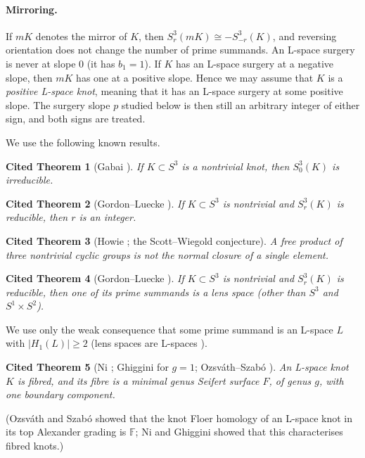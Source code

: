 \documentclass[11pt]{article}
\newtheorem{citedthm}{Cited Theorem}
\theoremstyle{definition}
\newcommand{\F}{\mathbb{F}}
\begin{document}
\paragraph{Mirroring.} If $mK$ denotes the mirror of $K$, then $S^3_r(mK)\cong -S^3_{-r}(K)$, and reversing orientation does not change the number of prime summands. An L-space surgery is never at slope $0$ (it has $b_1=1$). If $K$ has an L-space surgery at a negative slope, then $mK$ has one at a positive slope. Hence we may assume that $K$ is a \emph{positive L-space knot}, meaning that it has an L-space surgery at some positive slope. The surgery slope $p$ studied below is then still an arbitrary integer of either sign, and both signs are treated.

\medskip
We use the following known results.

\begin{citedthm}[Gabai \cite{Gabai}]\label{thm:gabai}
If $K\subset S^3$ is a nontrivial knot, then $S^3_0(K)$ is irreducible.
\end{citedthm}

\begin{citedthm}[Gordon--Luecke \cite{GL87}]\label{thm:GL87}
If $K\subset S^3$ is nontrivial and $S^3_r(K)$ is reducible, then $r$ is an integer.
\end{citedthm}

\begin{citedthm}[Howie \cite{Howie}; the Scott--Wiegold conjecture]\label{thm:howie}
A free product of three nontrivial cyclic groups is not the normal closure of a single element.
\end{citedthm}

\begin{citedthm}[Gordon--Luecke \cite{GL96}]\label{thm:GL96}
If $K\subset S^3$ is nontrivial and $S^3_r(K)$ is reducible, then one of its prime summands is a lens space (other than $S^3$ and $S^1\times S^2$).
\end{citedthm}
We use only the weak consequence that some prime summand is an L-space $L$ with $|H_1(L)|\ge 2$ (lens spaces are L-spaces \cite{OSlens}).

\begin{citedthm}[Ni \cite{Ni}; Ghiggini \cite{Ghiggini} for $g=1$; Ozsv\'ath--Szab\'o \cite{OSlens}]\label{thm:fibred}
An L-space knot $K$ is fibred, and its fibre is a minimal genus Seifert surface $F$, of genus $g$, with one boundary component.
\end{citedthm}
(Ozsv\'ath and Szab\'o \cite{OSlens} showed that the knot Floer homology of an L-space knot in its top Alexander grading is $\F$; Ni and Ghiggini showed that this characterises fibred knots.)
\end{document}
